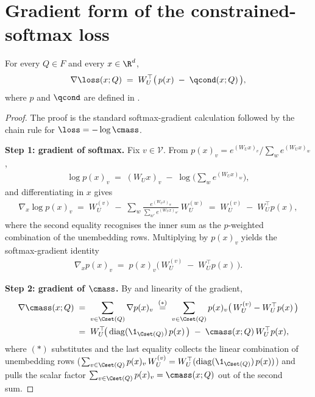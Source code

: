 \section{Gradient form of the constrained-softmax loss}
\label{sec:gradient_form}

\begin{lemma}\label{lem:gradient_form}
For every $Q \in F$ and every $x \in \R^d$,
\begin{align}\label{eq:gradient_form}
   \nabla \loss(x; Q) \;=\; W_U^\top \bigl(\, p(x) \;-\; \qcond(x; Q) \,\bigr),
\end{align}
where $p$ and $\qcond$ are defined in .
\end{lemma}

\begin{proof}
The proof is the standard softmax-gradient calculation followed by the
chain rule for $\loss = -\log \cmass$.

\noindent\textbf{Step 1: gradient of softmax.}
Fix $v \in \mathcal V$. From $p(x)_v = e^{(W_U x)_v} / \sum_w e^{(W_U x)_w}$,
\begin{align*}
   \log p(x)_v
   \;=\; (W_U x)_v \;-\; \log\!\Big(\textstyle\sum_w e^{(W_U x)_w}\Big),
\end{align*}
and differentiating in $x$ gives
\begin{align*}
   \nabla_x \log p(x)_v
   \;=\; W_U^{(v)} \;-\; \sum_w \frac{e^{(W_U x)_w}}{\sum_{w'} e^{(W_U x)_{w'}}}\, W_U^{(w)}
   \;=\; W_U^{(v)} \;-\; W_U^\top p(x),
\end{align*}
where the second equality recognises the inner sum as the $p$-weighted
combination of the unembedding rows. Multiplying by $p(x)_v$ yields the
softmax-gradient identity
\begin{align}\label{eq:softmax_grad}
   \nabla_x p(x)_v
   \;=\; p(x)_v \bigl(\, W_U^{(v)} \;-\; W_U^\top p(x) \,\bigr).
\end{align}

\noindent\textbf{Step 2: gradient of $\cmass$.}
By  and linearity of the gradient,
\begin{align*}
   \nabla \cmass(x; Q)
   &\;=\; \sum_{v \in \Cset(Q)} \nabla p(x)_v
   \;\stackrel{(\ast)}{=}\; \sum_{v \in \Cset(Q)} p(x)_v \bigl(\, W_U^{(v)} - W_U^\top p(x) \,\bigr) \\
   &\;=\; W_U^\top\!\bigl(\, \mathrm{diag}(\1_{\Cset(Q)})\, p(x) \,\bigr)
       \;-\; \cmass(x; Q)\, W_U^\top p(x),
\end{align*}
where $(\ast)$ substitutes  and the last equality
collects the linear combination of unembedding rows
($\sum_{v \in \Cset(Q)} p(x)_v\, W_U^{(v)} = W_U^\top (\mathrm{diag}(\1_{\Cset(Q)})\, p(x))$)
and pulls the scalar factor $\sum_{v \in \Cset(Q)} p(x)_v = \cmass(x; Q)$
out of the second sum.


\end{proof}
